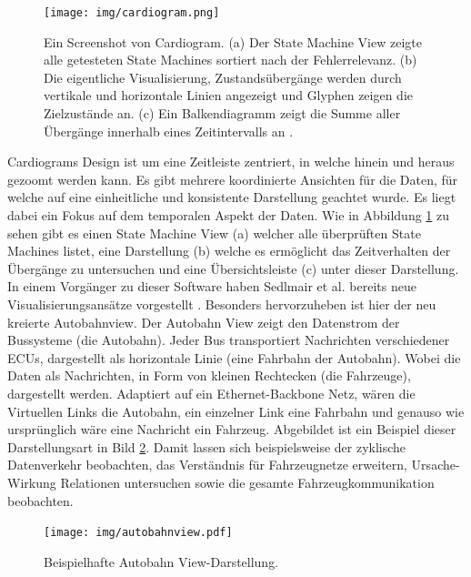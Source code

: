 \documentclass[draft=false
              ,paper=a4
              ,twoside=false
              ,fontsize=11pt
              ,headsepline
              ,BCOR10mm
              ,DIV11
              ]{scrbook}
\begin{document}
\begin{figure}[htbp]
  \centering
  \texttt{[image: img/cardiogram.png]}
  \caption{Ein Screenshot von Cardiogram. (a) Der State Machine View zeigte alle getesteten State Machines sortiert nach der Fehlerrelevanz. (b) Die eigentliche Visualisierung, Zustandsübergänge werden durch vertikale und horizontale Linien angezeigt und Glyphen zeigen die Zielzustände an. (c) Ein Balkendiagramm zeigt die Summe aller Übergänge innerhalb eines Zeitintervalls an \cite{sedlmair_cardiogram:_2011}.}
  \label{fig:cardiogram}
\end{figure}

Cardiograms Design ist um eine Zeitleiste zentriert, in welche hinein und heraus gezoomt werden kann. Es gibt mehrere koordinierte Ansichten für die Daten, für welche auf eine einheitliche und konsistente Darstellung geachtet wurde. Es liegt dabei ein Fokus auf dem temporalen Aspekt der Daten. Wie in Abbildung \ref{fig:cardiogram} zu sehen gibt es einen State Machine View (a) welcher alle überprüften State Machines listet, eine Darstellung (b) welche es ermöglicht das Zeitverhalten der Übergänge zu untersuchen und eine Übersichtsleiste (c) unter dieser Darstellung. In einem Vorgänger zu dieser Software haben Sedlmair et al. bereits neue Visualisierungsansätze vorgestellt \cite{sedlmair2009}. Besonders hervorzuheben ist hier der neu kreierte Autobahnview. Der Autobahn View zeigt den Datenstrom der Bussysteme (die Autobahn). Jeder Bus transportiert Nachrichten verschiedener ECUs, dargestellt als horizontale Linie (eine Fahrbahn der Autobahn). Wobei die Daten als Nachrichten, in Form von kleinen Rechtecken (die Fahrzeuge), dargestellt werden. Adaptiert auf ein Ethernet-Backbone Netz, wären die Virtuellen Links die Autobahn, ein einzelner Link eine Fahrbahn und genauso wie ursprünglich wäre eine Nachricht ein Fahrzeug. Abgebildet ist ein Beispiel dieser Darstellungsart in Bild \ref{fig:autobahnview}. Damit lassen sich beispielsweise der zyklische Datenverkehr beobachten, das Verständnis für Fahrzeugnetze erweitern, Ursache-Wirkung Relationen untersuchen sowie die gesamte Fahrzeugkommunikation beobachten. 

\begin{figure}[htbp]
  \centering
  \texttt{[image: img/autobahnview.pdf]}
  \caption{Beispielhafte Autobahn View-Darstellung.}
  \label{fig:autobahnview}
\end{figure}
\end{document}
